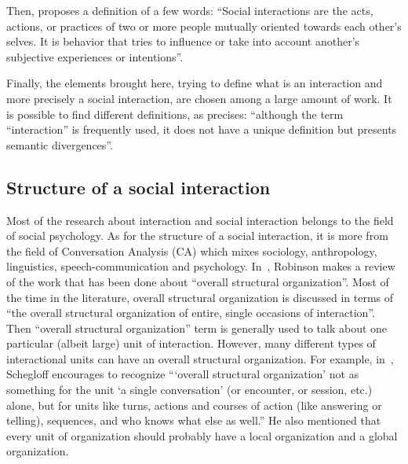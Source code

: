 \documentclass[a4paper,11pt,twoside]{StyleThese}
\begin{document}
Then, \cite{rummel_1976_understanding} proposes a definition of a few words: ``Social interactions are the acts, actions, or practices of two or more people mutually oriented towards each other's selves. It is behavior that tries to influence or take into account another's subjective experiences or intentions''.

Finally, the elements brought here, trying to define what is an interaction and more precisely a social interaction, are chosen among a large amount of work. It is possible to find different definitions, as \cite{enriquez_2017_vocabulaire} precises: ``although the term ``interaction'' is frequently used, it does not have a unique definition but presents semantic divergences''.

\subsection{Structure of a social interaction}\label{chap1:subsec:social_int}
Most of the research about interaction and social interaction belongs to the field of social psychology. As for the structure of a social interaction, it is more from the field of Conversation Analysis (CA) which mixes sociology, anthropology, linguistics, speech-communication and psychology.
In~\cite{robinson_overall_2012}, Robinson makes a review of the work that has been done about ``overall structural organization''. Most of the time in the literature, overall structural organization is discussed in terms of ``the overall structural organization of entire, single occasions of interaction''.  Then ``overall structural organization'' term is generally used to talk about one particular (albeit large) unit of interaction. However, many different types of interactional units can have an overall structural organization. For example, in~\cite{schegloff_2011_word}, Schegloff encourages to recognize ``‘overall structural organization’ not as something for the unit ‘a single conversation’ (or encounter, or session, etc.) alone, but for units like turns, actions and courses of action (like answering or telling), sequences, and who knows what else as well.'' He also mentioned that every unit of organization should probably have a local organization and a global organization.
\end{document}
